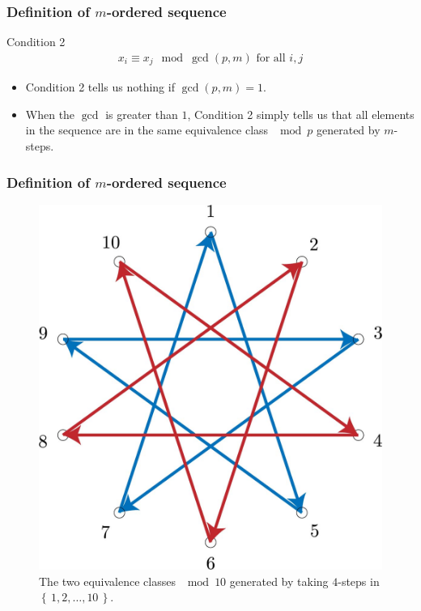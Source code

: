 \documentclass{beamer}
\theoremstyle{plain}
\theoremstyle{definition}
\theoremstyle{remark}
\newcommand{\bee}{\begin{equation}\begin{aligned}}
\newcommand{\eee}{\end{aligned}\end{equation}}
\renewcommand{\'}{\hspace{0.5mm}'}		%
\renewcommand{\Set}[1]{\left\{\,#1\,\right\}}	%
\begin{document}

\begin{frame}
\frametitle{Definition of $m$-ordered sequence}
	\begin{block}{Condition 2}
	\bee
			x_i \equiv x_j \mod \gcd(p,m) \text{ for all }
			i,j
	\eee
	\end{block}
	
	\begin{itemize}
		\item Condition 2 tells us nothing if $\gcd(p,m) = 1$. 
		\item When the $\gcd$ is greater than $1$, 
		Condition 2 simply tells us that all
		elements in the sequence are in the same equivalence
		class $\mod p$ generated by $m$-steps. 
	\end{itemize}
	
\end{frame}


\begin{frame}
\frametitle{Definition of $m$-ordered sequence}

	\begin{figure}
		\includegraphics[scale=0.1]{circ_10_4_equiv.jpg}
		\caption{The two equivalence classes $\mod 10$
		generated by taking $4$-steps in 
		$\Set{1,2,\hdots, 10}$. }
	\end{figure}
	
\end{frame}
\end{document}
